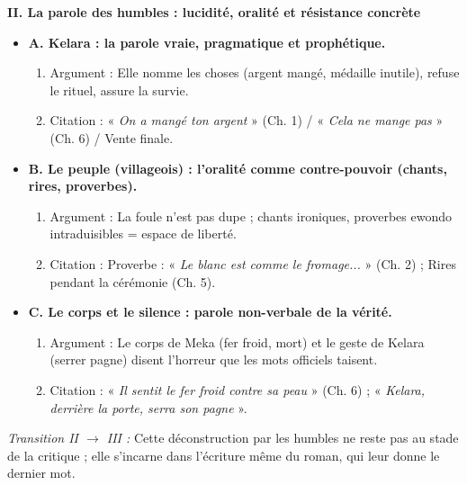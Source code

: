 \documentclass[11pt]{article}
\begin{document}
\begin{exoresolu}
\textbf{II. La parole des humbles : lucidité, oralité et résistance concrète}
\begin{itemize}
    \item \textbf{A. Kelara : la parole vraie, pragmatique et prophétique.}
    \begin{enumerate}
        \item Argument : Elle nomme les choses (argent mangé, médaille inutile), refuse le rituel, assure la survie.
        \item Citation : « \emph{On a mangé ton argent} » (Ch. 1) / « \emph{Cela ne mange pas} » (Ch. 6) / Vente finale.
    \end{enumerate}
    \item \textbf{B. Le peuple (villageois) : l'oralité comme contre-pouvoir (chants, rires, proverbes).}
    \begin{enumerate}
        \item Argument : La foule n'est pas dupe ; chants ironiques, proverbes ewondo intraduisibles = espace de liberté.
        \item Citation : Proverbe : « \emph{Le blanc est comme le fromage...} » (Ch. 2) ; Rires pendant la cérémonie (Ch. 5).
    \end{enumerate}
    \item \textbf{C. Le corps et le silence : parole non-verbale de la vérité.}
    \begin{enumerate}
        \item Argument : Le corps de Meka (fer froid, mort) et le geste de Kelara (serrer pagne) disent l'horreur que les mots officiels taisent.
        \item Citation : « \emph{Il sentit le fer froid contre sa peau} » (Ch. 6) ; « \emph{Kelara, derrière la porte, serra son pagne} ».
    \end{enumerate}
\end{itemize}

\textit{Transition II $\to$ III :} Cette déconstruction par les humbles ne reste pas au stade de la critique ; elle s'incarne dans l'écriture même du roman, qui leur donne le dernier mot.


\end{exoresolu}
\end{document}
